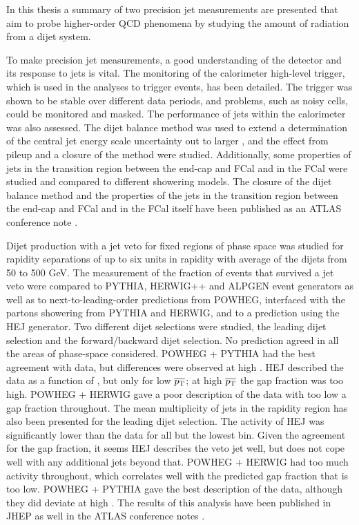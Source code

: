 In this thesis a summary of two precision jet measurements are presented that aim to probe higher-order QCD phenomena by studying the amount of radiation from a dijet system.

To make precision jet measurements, a good understanding of the detector and its response to jets is vital. 
The monitoring of the calorimeter high-level trigger, which is used in the analyses to trigger events, has been detailed. 
The trigger was shown to be stable over different data periods, and problems, such as noisy cells, could be monitored and masked.
The performance of jets within the calorimeter was also assessed.
The dijet \pt{} balance method was used to extend a determination of the central jet energy scale uncertainty out to larger \dy{}, and the effect from pileup and a closure of the method were studied. 
Additionally, some properties of jets in the transition region between the end-cap and FCal and in the FCal were studied and compared to different showering models.
The closure of the dijet \pt{} balance method and the properties of the jets in the transition region between the end-cap and FCal and in the FCal itself have been  published as an ATLAS conference note \cite{ref:EtaInter2010}.

Dijet production with a jet veto for fixed regions of phase space was studied for rapidity separations of up to six units in rapidity with average \pt{} of the dijets from 50 to 500 GeV.  
The measurement of the fraction of events that survived a jet veto were compared to PYTHIA, HERWIG++ and ALPGEN event generators as well as to next-to-leading-order predictions from POWHEG, interfaced with the partons showering from PYTHIA and HERWIG, and to a prediction using the HEJ generator.
Two different dijet selections were studied, the leading \pt{} dijet selection and the forward/backward dijet selection. 
No prediction agreed in all the areas of phase-space considered.
POWHEG + PYTHIA had the best agreement with data, but differences were observed at high \dy{}.
HEJ described the data as a function of \dy{}, but only for low $\mbox{$\overline{p_{\rm T}}$}{}$; at high $\mbox{$\overline{p_{\rm T}}$}{}$ the gap fraction was too high.
POWHEG + HERWIG gave a poor description of the data with too low a gap fraction throughout.
The mean multiplicity of jets in the rapidity region has also been presented for the leading \pt{} dijet selection.
The activity of HEJ was significantly lower than the data for all but the lowest \dy{} bin. 
Given the agreement for the gap fraction, it seems HEJ describes the veto jet well, but does not cope well with any additional jets beyond that. 
POWHEG + HERWIG had too much activity throughout, which correlates well with the predicted gap fraction that is too low.
POWHEG + PYTHIA gave the best description of the data, although they did deviate at high \dy{}.
The results of this analysis have been published in JHEP \cite{ref:ATLASGap} as well in the ATLAS conference notes \cite{ref:GBJConf1,ref:GBJConf2}.

